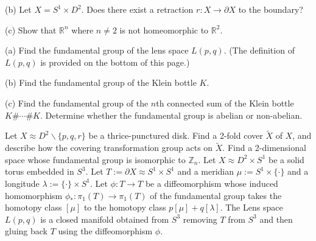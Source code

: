 \documentclass[10pt]{article}
\begin{document}
(b) Let $X=S^{1} \times D^{2}$. Does there exist a retraction $r: X \rightarrow \partial X$ to the boundary?

(c) Show that $\mathbb{R}^{n}$ where $n \neq 2$ is not homeomorphic to $\mathbb{R}^{2}$.

\newpage
(a) Find the fundamental group of the lens space $L(p, q)$. (The definition of $L(p, q)$ is provided on the bottom of this page.)

(b) Find the fundamental group of the Klein bottle $K$.

(c) Find the fundamental group of the $n$th connected sum of the Klein bottle $K \# \cdots \# K$. Determine whether the fundamental group is abelian or non-abelian.

\newpage
Let $X \approx D^{2} \backslash\{p, q, r\}$ be a thrice-punctured disk. Find a 2-fold cover $\tilde{X}$ of $X$, and describe how the covering transformation group acts on $\tilde{X}$.
\newpage
Find a 2-dimensional space whose fundamental group is isomorphic to $\mathbb{Z}_{n}$.
\newpage
Let $X \approx D^{2} \times S^{1}$ be a solid torus embedded in $S^{3}$. Let $T:=\partial X \approx S^{1} \times S^{1}$ and a meridian $\mu:=S^{1} \times\{\cdot\}$ and a longitude $\lambda:=\{\cdot\} \times S^{1}$. Let $\phi: T \rightarrow T$ be a diffeomorphism whose induced homomorphism $\phi_{*}: \pi_{1}(T) \rightarrow \pi_{1}(T)$ of the fundamental group takes the homotopy class $[\mu]$ to the homotopy class $p[\mu]+q[\lambda]$. The Lens space $L(p, q)$ is a closed manifold obtained from $S^{3}$ removing $T$ from $S^{3}$ and then gluing back $T$ using the diffeomorphism $\phi$.
\end{document}
